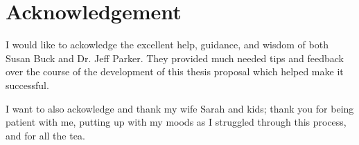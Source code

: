 %
\chapter*{Acknowledgement}
\label{sec:acknowledgement}
\vspace*{-10mm}


I would like to ackowledge the excellent help, guidance, and wisdom of both Susan Buck and Dr. Jeff Parker.  They provided much needed tips and feedback over the course of the development of this thesis proposal which helped make it successful.

I want to also ackowledge and thank my wife Sarah and kids; thank you for being patient with me, putting up with my moods as I struggled through this process, and for all the tea.

